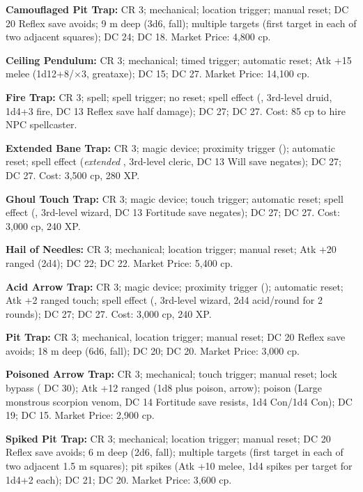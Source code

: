 \textbf{Camouflaged Pit Trap:} CR 3; mechanical; location trigger; manual reset; DC 20 Reflex save avoids; 9 m deep (3d6, fall); multiple targets (first target in each of two adjacent squares);  DC 24;  DC 18. Market Price: 4,800 cp.

\textbf{Ceiling Pendulum:} CR 3; mechanical; timed trigger; automatic reset; Atk +15 melee (1d12+8/$\times$3, greataxe);  DC 15;  DC 27. Market Price: 14,100 cp.

\textbf{Fire Trap:} CR 3; spell; spell trigger; no reset; spell effect (, 3rd-level druid, 1d4+3 fire, DC 13 Reflex save half damage);  DC 27;  DC 27. Cost: 85 cp to hire NPC spellcaster.

\textbf{Extended Bane Trap:} CR 3; magic device; proximity trigger (); automatic reset; spell effect (\emph{extended} , 3rd-level cleric, DC 13 Will save negates);  DC 27;  DC 27. Cost: 3,500 cp, 280 XP.

\textbf{Ghoul Touch Trap:} CR 3; magic device; touch trigger; automatic reset; spell effect (, 3rd-level wizard, DC 13 Fortitude save negates);  DC 27;  DC 27. Cost: 3,000 cp, 240 XP.

\textbf{Hail of Needles:} CR 3; mechanical; location trigger; manual reset; Atk +20 ranged (2d4);  DC 22;  DC 22. Market Price: 5,400 cp.

\textbf{Acid Arrow Trap:} CR 3; magic device; proximity trigger (); automatic reset; Atk +2 ranged touch; spell effect (, 3rd-level wizard, 2d4 acid/round for 2 rounds);  DC 27;  DC 27. Cost: 3,000 cp, 240 XP.

\textbf{Pit Trap:} CR 3; mechanical, location trigger; manual reset; DC 20 Reflex save avoids; 18 m deep (6d6, fall);  DC 20;  DC 20. Market Price: 3,000 cp.

\textbf{Poisoned Arrow Trap:} CR 3; mechanical; touch trigger; manual reset; lock bypass ( DC 30); Atk +12 ranged (1d8 plus poison, arrow); poison (Large monstrous scorpion venom, DC 14 Fortitude save resists, 1d4 Con/1d4 Con);  DC 19;  DC 15. Market Price: 2,900 cp.

\textbf{Spiked Pit Trap:} CR 3; mechanical; location trigger; manual reset; DC 20 Reflex save avoids; 6 m deep (2d6, fall); multiple targets (first target in each of two adjacent 1.5 m squares); pit spikes (Atk +10 melee, 1d4 spikes per target for 1d4+2 each);  DC 21;  DC 20. Market Price: 3,600 cp.

